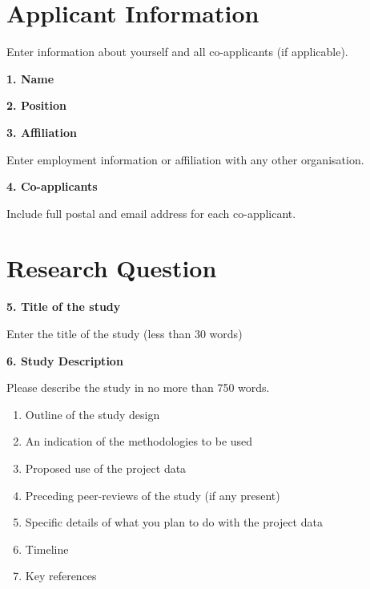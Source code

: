 \documentclass[a4paper,12pt]{article}
\begin{document}
\begin{Form}

\section*{Applicant Information}

Enter information about yourself and all co-applicants (if applicable).

\textbf{1. Name}

\TextField[name=applicantName]{}

\textbf{2. Position}

\TextField[name=applicantPosition]{}

\textbf{3. Affiliation}

Enter employment information or affiliation with any other organisation.

\TextField[name=applicantAffiliation,multiline=true,height=8\baselineskip]{}

\newpage

\textbf{4. Co-applicants}

Include full postal and email address for each co-applicant.

\TextField[name=coapplicants,multiline=true,height=24\baselineskip]{}

\section*{Research Question}

\textbf{5. Title of the study}

Enter the title of the study (less than 30 words)

\TextField[name=studyTitle,multiline=true,height=3\baselineskip]{}

\textbf{6. Study Description}

Please describe the study in no more than 750 words.

\begin{enumerate}
  \item Outline of the study design
  \item An indication of the methodologies to be used
  \item Proposed use of the project data
  \item Preceding peer-reviews of the study (if any present)
  \item Specific details of what you plan to do with the project data
  \item Timeline
  \item Key references
\end{enumerate}


\end{Form}
\end{document}
